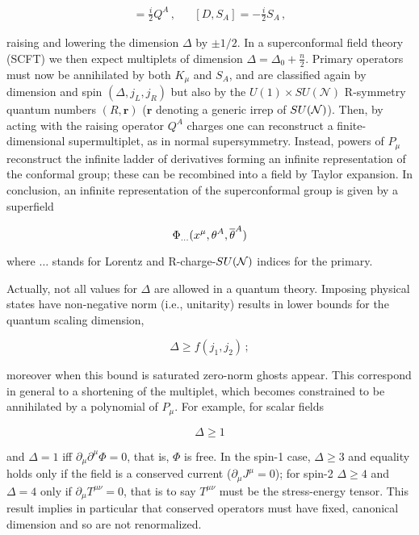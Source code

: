 \begin{align}
	[D,Q^A] = \frac{i}{2} Q^A\,, && [D,S_A] = - \frac{i}{2} S_A\,,
	\label{}
\end{align}

raising and lowering the dimension $\Delta$ by $\pm 1/2$. In a superconformal field theory (SCFT) we then expect multiplets of dimension $\Delta = \Delta_0 + \frac{n}{2}$. Primary operators must now be annihilated by both $K_\mu$ and $S_A$, and are classified again by dimension and spin $(\Delta,j_L,j_R)$ but also by the $U(1)\times SU(\mathcal{N})$ R-symmetry quantum numbers $(R,\mathbf{r})$ ($\mathbf{r}$ denoting a generic irrep of $SU(\mathcal{N})$). Then, by acting with the raising operator $Q^A$ charges one can reconstruct a finite-dimensional supermultiplet, as in normal supersymmetry. Instead, powers of $P_\mu$ reconstruct the infinite ladder of derivatives forming an infinite representation of the conformal group; these can be recombined into a field by Taylor expansion. In conclusion, an infinite representation of the superconformal group is given by a superfield

\begin{equation}
	\Phi_{\ldots} (x^\mu , \theta^A, \overline{\theta}^A)
	\label{}
\end{equation}

where $\ldots$ stands for Lorentz and R-charge-$SU(\mathcal{N})$ indices for the primary.

Actually, not all values for $\Delta$ are allowed in a quantum theory. Imposing physical states have non-negative norm (i.e., unitarity) results in lower bounds for the quantum scaling dimension,

\begin{equation}
	\Delta \geq f(j_1,j_2)\,;
	\label{}
\end{equation}

moreover when this bound is saturated zero-norm ghosts appear. This correspond in general to a shortening of the multiplet, which becomes constrained to be annihilated by a polynomial of $P_\mu$. For example, for scalar fields

\begin{equation}
	\Delta \geq 1
	\label{}
\end{equation}

and $\Delta = 1$ iff $\partial_\mu \partial^\mu \Phi = 0$, that is, $\Phi$ is free. In the spin-1 case, $\Delta \geq 3$ and equality holds only if the field is a conserved current ($\partial_\mu J^\mu = 0$); for spin-2 $\Delta \geq 4$ and $\Delta = 4$ only if $\partial_\mu T^{\mu\nu} = 0$, that is to say $T^{\mu\nu}$ must be the stress-energy tensor. This result implies in particular that conserved operators must have fixed, canonical dimension and so are not renormalized.

